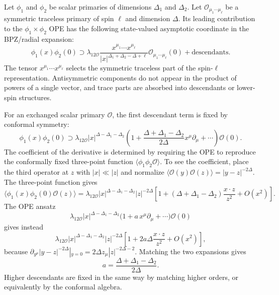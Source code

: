 Let \(\phi_1\) and \(\phi_2\) be scalar primaries of dimensions
\(\Delta_1\) and \(\Delta_2\).  Let
\(\mathcal O_{\mu_1\cdots\mu_\ell}\) be a symmetric traceless primary of spin
\(\ell\) and dimension \(\Delta\).  Its leading contribution to the
\(\phi_1\times\phi_2\) OPE has the following state-valued asymptotic
coordinate in the BPZ/radial expansion:
\begin{equation}
  \phi_1(x)\phi_2(0)
  \supset
  \lambda_{12\mathcal O}
  \frac{x^{\mu_1}\cdots x^{\mu_\ell}}
       {|x|^{\Delta_1+\Delta_2-\Delta+\ell}}
  \mathcal O_{\mu_1\cdots\mu_\ell}(0)
  +\text{descendants}.
  \label{eq:scalar-scalar-leading-ope}
\end{equation}
The tensor \(x^{\mu_1}\cdots x^{\mu_\ell}\) selects the symmetric traceless
part of the spin-\(\ell\) representation.  Antisymmetric components do not
appear in the product of powers of a single vector, and trace parts are
absorbed into descendants or lower-spin structures.

For an exchanged scalar primary \(\mathcal O\), the first descendant term is
fixed by conformal symmetry:
\begin{equation}
  \phi_1(x)\phi_2(0)
  \supset
  \lambda_{12\mathcal O}
  |x|^{\Delta-\Delta_1-\Delta_2}
  \left(
    1+
    \frac{\Delta+\Delta_1-\Delta_2}{2\Delta}
    x^\mu\partial_\mu+\cdots
  \right)\mathcal O(0).
  \label{eq:scalar-ope-first-descendant}
\end{equation}
The coefficient of the derivative is determined by requiring the OPE to
reproduce the conformally fixed three-point function
\(\langle\phi_1\phi_2\mathcal O\rangle\).  To see the coefficient, place the
third operator at \(z\) with \(|x|\ll |z|\) and normalize
\(\langle\mathcal O(y)\mathcal O(z)\rangle=|y-z|^{-2\Delta}\).  The
three-point function gives
\[
  \langle\phi_1(x)\phi_2(0)\mathcal O(z)\rangle
  =
  \lambda_{12\mathcal O}
  |x|^{\Delta-\Delta_1-\Delta_2}|z|^{-2\Delta}
  \left[
    1+
    (\Delta+\Delta_1-\Delta_2)
    \frac{x\cdot z}{z^2}
    +O(x^2)
  \right].
\]
The OPE ansatz
\[
  \lambda_{12\mathcal O}
  |x|^{\Delta-\Delta_1-\Delta_2}
  \bigl(1+a\,x^\mu\partial_\mu+\cdots\bigr)\mathcal O(0)
\]
gives instead
\[
  \lambda_{12\mathcal O}
  |x|^{\Delta-\Delta_1-\Delta_2}|z|^{-2\Delta}
  \left[
    1+2a\Delta\frac{x\cdot z}{z^2}+O(x^2)
  \right],
\]
because
\(\partial_{y^\mu}|y-z|^{-2\Delta}|_{y=0}
=2\Delta z_\mu |z|^{-2\Delta-2}\).  Matching the two expansions gives
\[
  a=\frac{\Delta+\Delta_1-\Delta_2}{2\Delta}.
\]
Higher descendants are fixed in the same way by matching higher orders, or
equivalently by the conformal algebra.


